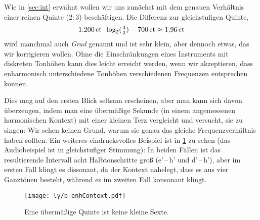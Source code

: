 Wie in \cref{sec:int} erwähnt wollen wir uns zunächst mit dem genauen Verhältnis
einer reinen Quinte ($2:3$) beschäftigen. Die Differenz zur gleichstufigen
Quinte,
\[1{.}200\,\mathrm{ct}\cdot \log_2(\tfrac32) - 700\,\mathrm{ct} \approx
  1{,}96\,\mathrm{ct}\]%
wird manchmal auch \emph{Grad} genannt und ist sehr klein, aber dennoch etwas,
das wir korrigieren wollen. Ohne die Einschränkungen eines Instruments mit
diskreten Tonhöhen kann dies leicht erreicht werden, wenn wir akzeptieren, dass
enharmonisch unterschiedene Tonhöhen verschiedenen Frequenzen entsprechen
können.

Dies mag auf den ersten Blick seltsam erscheinen, aber man kann sich davon
überzeugen, indem man eine übermäßige Sekunde (in einem angemessenen
harmonischen Kontext) mit einer kleinen Terz vergleicht und versucht, sie zu
singen: Wir sehen keinen Grund, warum sie genau das gleiche Frequenzverhältnis
haben sollten. Ein weiteres eindrucksvolles Beispiel ist in
\cref{fig:enhContext} zu sehen (das Audiobeispiel ist in gleichstufiger
Stimmung): In beiden Fällen ist das resultierende Intervall acht Halbtonschritte
groß (\flat e’\,–\,h’ und \sharp d’\,–\,h’), aber im ersten Fall klingt es
dissonant, da der Kontext nahelegt, dass es aus vier Ganztönen besteht, während
es im zweiten Fall konsonant klingt.

\begin{figure}[h]
  \centering
  \texttt{[image: ly/b-enhContext.pdf]}
  \caption{Eine übermäßige Quinte ist keine kleine Sexte.}\label{fig:enhContext}
\end{figure}

